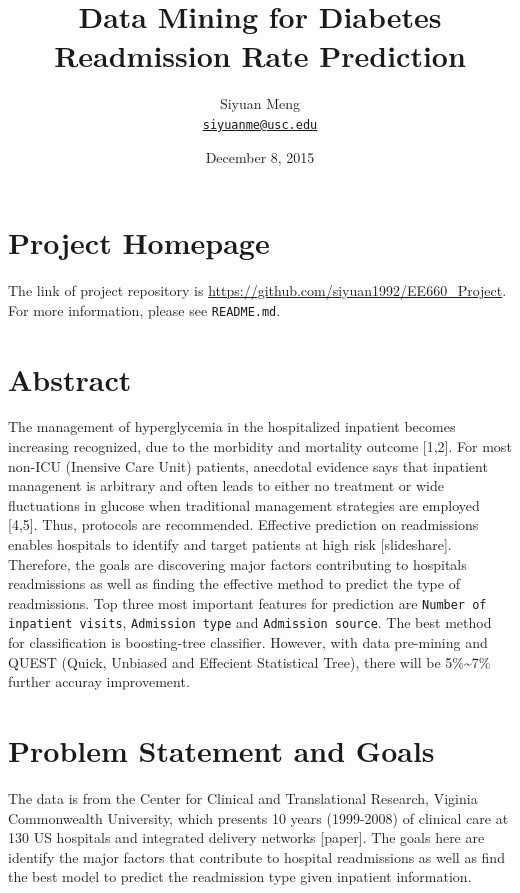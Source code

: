 \documentclass[]{article}
\title{Data Mining for Diabetes Readmission Rate Prediction}
\author{Siyuan Meng \\ \href{mailto:siyuanme@usc.edu}{\nolinkurl{siyuanme@usc.edu}}}
\date{December 8, 2015}
\begin{document}
\maketitle


\section{Project Homepage}\label{project-homepage}

The link of project repository is
\url{https://github.com/siyuan1992/EE660_Project}. For more information,
please see \texttt{README.md}.

\section{Abstract}\label{abstract}

The management of hyperglycemia in the hospitalized inpatient becomes
increasing recognized, due to the morbidity and mortality outcome
{[}1,2{]}. For most non-ICU (Inensive Care Unit) patients, anecdotal
evidence says that inpatient managenent is arbitrary and often leads to
either no treatment or wide fluctuations in glucose when traditional
management strategies are employed {[}4,5{]}. Thus, protocols are
recommended. Effective prediction on readmissions enables hospitals to
identify and target patients at high risk {[}slideshare{]}. Therefore,
the goals are discovering major factors contributing to hospitals
readmissions as well as finding the effective method to predict the type
of readmissions. Top three most important features for prediction are
\texttt{Number of inpatient visits}, \texttt{Admission type} and
\texttt{Admission source}. The best method for classification is
boosting-tree classifier. However, with data pre-mining and QUEST
(Quick, Unbiased and Effecient Statistical Tree), there will be
5\%\textasciitilde{}7\% further accuray improvement.

\section{Problem Statement and Goals}\label{problem-statement-and-goals}

The data is from the Center for Clinical and Translational Research,
Viginia Commonwealth University, which presents 10 years (1999-2008) of
clinical care at 130 US hospitals and integrated delivery networks
{[}paper{]}. The goals here are identify the major factors that
contribute to hospital readmissions as well as find the best model to
predict the readmission type given inpatient information.
\end{document}
